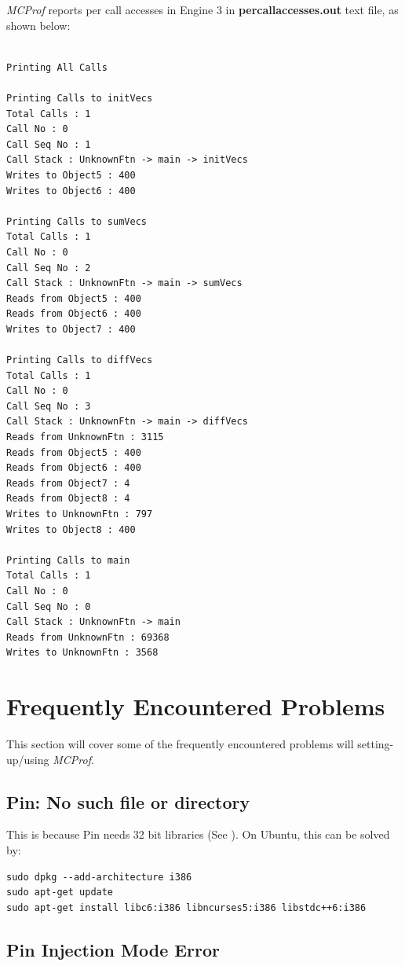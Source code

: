 \documentclass[11pt]{article}
\newcommand{\MCPROF}{\emph{MCProf}}
\begin{document}
\MCPROF{} reports per call accesses in Engine 3 in \textbf{percallaccesses.out}
text file, as shown below:

{
\scriptsize
\begin{Verbatim}[frame=single]

Printing All Calls

Printing Calls to initVecs
Total Calls : 1
Call No : 0
Call Seq No : 1
Call Stack : UnknownFtn -> main -> initVecs
Writes to Object5 : 400
Writes to Object6 : 400

Printing Calls to sumVecs
Total Calls : 1
Call No : 0
Call Seq No : 2
Call Stack : UnknownFtn -> main -> sumVecs
Reads from Object5 : 400
Reads from Object6 : 400
Writes to Object7 : 400

Printing Calls to diffVecs
Total Calls : 1
Call No : 0
Call Seq No : 3
Call Stack : UnknownFtn -> main -> diffVecs
Reads from UnknownFtn : 3115
Reads from Object5 : 400
Reads from Object6 : 400
Reads from Object7 : 4
Reads from Object8 : 4
Writes to UnknownFtn : 797
Writes to Object8 : 400

Printing Calls to main
Total Calls : 1
Call No : 0
Call Seq No : 0
Call Stack : UnknownFtn -> main
Reads from UnknownFtn : 69368
Writes to UnknownFtn : 3568
\end{Verbatim}
}


\section{Frequently Encountered Problems}
\label{sec:faq}

This section will cover some of the frequently encountered problems will
setting-up/using \MCPROF{}.

\subsection{Pin: No such file or directory}
This is because Pin needs 32 bit libraries (See \cite{PinLibs32}).
On Ubuntu, this can be solved by:
{
\small
\begin{Verbatim}[frame=single, samepage=true]
sudo dpkg --add-architecture i386
sudo apt-get update
sudo apt-get install libc6:i386 libncurses5:i386 libstdc++6:i386
\end{Verbatim}
}


\subsection{Pin Injection Mode Error}
\end{document}
